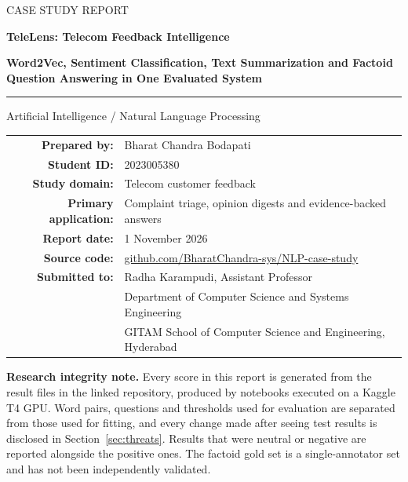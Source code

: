 \documentclass[11pt,a4paper]{article}
\newcommand{\repo}{https://github.com/BharatChandra-sys/NLP-case-study}
\begin{document}
\sloppy
\begin{titlepage}
\centering
\vspace*{2.2cm}
{\large CASE STUDY REPORT\par}
\vspace{1.4cm}
{\LARGE\bfseries TeleLens: Telecom Feedback Intelligence\par}
\vspace{0.5cm}
{\Large\bfseries Word2Vec, Sentiment Classification, Text Summarization and Factoid Question Answering in One Evaluated System\par}
\vspace{0.8cm}
\rule{0.82\textwidth}{0.4pt}\par
\vspace{0.8cm}
{\large Artificial Intelligence / Natural Language Processing\par}
\vspace{1.2cm}
\begin{tabular}{rl}
\textbf{Prepared by:} & Bharat Chandra Bodapati\\
\textbf{Student ID:} & 2023005380\\
\textbf{Study domain:} & Telecom customer feedback\\
\textbf{Primary application:} & Complaint triage, opinion digests and evidence-backed answers\\
\textbf{Report date:} & 1 November 2026\\
\textbf{Source code:} & \href{\repo}{github.com/BharatChandra-sys/NLP-case-study}\\[8pt]
\textbf{Submitted to:} & Radha Karampudi, Assistant Professor\\
 & Department of Computer Science and Systems Engineering\\
 & GITAM School of Computer Science and Engineering, Hyderabad\\
\end{tabular}
\vfill
\begin{minipage}{0.88\textwidth}\small
\textbf{Research integrity note.} Every score in this report is generated from the result files in the linked repository, produced by notebooks executed on a Kaggle T4 GPU. Word pairs, questions and thresholds used for evaluation are separated from those used for fitting, and every change made after seeing test results is disclosed in Section~\ref{sec:threats}. Results that were neutral or negative are reported alongside the positive ones. The factoid gold set is a single-annotator set and has not been independently validated.
\end{minipage}
\end{titlepage}
\end{document}
